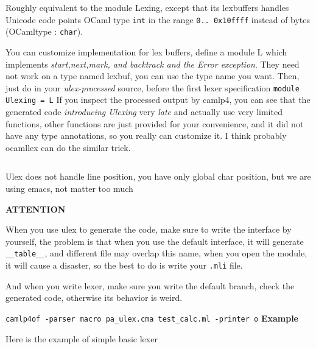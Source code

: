 Roughly equivalent to the module Lexing, except that its lexbuffers
handles Unicode code points  OCaml type \verb|int| in the range
\verb|0.. 0x10ffff| instead of bytes (OCamltype : \verb|char|).

    You can customize implementation for lex buffers, define a module
L which implements \emph{start,next,mark, and backtrack and the Error
exception}.  They need not work on a type named lexbuf, you can use
the type name you want.  Then, just do in your \emph{ulex-processed}
source, before the first lexer specification \verb|module Ulexing = L|
If you inspect the processed output by camlp4, you can see that the
generated code \emph{introducing Ulexing } very \emph{late} and
actually use very limited functions, other functions are just provided
for your convenience, and it did not have any type annotations, so you
really can customize it. I think probably ocamllex can do the similar
trick.
    
\inputminted[fontsize=\scriptsize, ]{ocaml}{code/ulex_intf.mli}
    
Ulex does not handle line position, you have only global char
position, but we are using emacs, not matter too much

\textbf{ATTENTION}

When you use ulex to generate the code, make sure to write the
interface by yourself, the problem is that when you use the default
interface, it will generate \verb|__table__|, and different file may
overlap this name, when you open the module, it will cause a disaster,
so the best to do is write your \verb|.mli| file.

And when you write lexer, make sure you write the default branch,
check the generated code, otherwise its behavior is weird.

\verb|camlp4of -parser macro pa_ulex.cma test_calc.ml -printer o|
\textbf{Example}

Here is the example of simple basic lexer 
\inputminted[fontsize=\scriptsize, ]{ocaml}{code/basic_ulex.ml}

